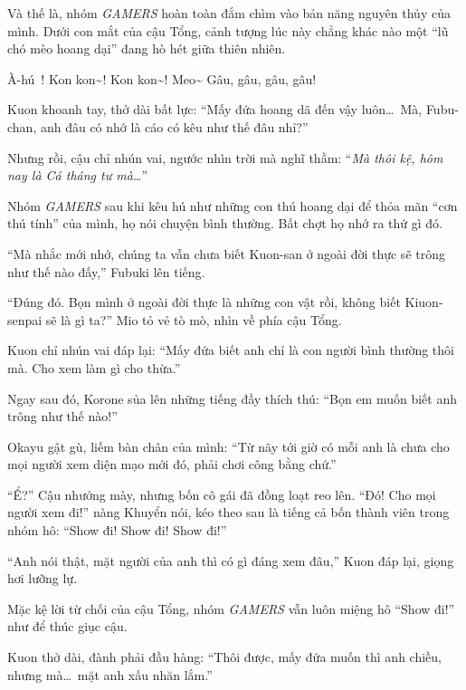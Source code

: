 \documentclass[../main.tex]{subfiles}
\begin{document}
Và thế là, nhóm \textit{GAMERS} hoàn toàn đắm chìm vào bản năng nguyên thủy của mình. Dưới con mắt của cậu Tổng, cảnh tượng lúc này chẳng khác nào một ``lũ chó mèo hoang dại'' đang hò hét giữa thiên nhiên.

\begin{dialogue}
     À-hú~!
     Kon kon\~{}! Kon kon\~{}!
     Meo\~{}
     Gâu, gâu, gâu, gâu!
\end{dialogue}

Kuon khoanh tay, thở dài bất lực: ``Mấy đứa hoang dã đến vậy luôn\dots\ Mà, Fubu-chan, anh đâu có nhớ là cáo có kêu như thế đâu nhỉ?''

Nhưng rồi, cậu chỉ nhún vai, ngước nhìn trời mà nghĩ thầm: ``\textit{Mà thôi kệ, hôm nay là Cá tháng tư mà\dots}''

\omk

Nhóm \textit{GAMERS} sau khi kêu hú như những con thú hoang dại để thỏa mãn ``cơn thú tính'' của mình, họ nói chuyện bình thường. Bất chợt họ nhớ ra thứ gì đó.

``Mà nhắc mới nhớ, chúng ta vẫn chưa biết Kuon-san ở ngoài đời thực sẽ trông như thế nào đấy,'' Fubuki lên tiếng.

``Đúng đó. Bọn mình ở ngoài đời thực là những con vật rồi, không biết Kiuon-senpai sẽ là gì ta?'' Mio tỏ vẻ tò mò, nhìn về phía cậu Tổng.

Kuon chỉ nhún vai đáp lại: ``Mấy đứa biết anh chỉ là con người bình thường thôi mà. Cho xem làm gì cho thừa.''

Ngay sau đó, Korone sủa lên những tiếng đầy thích thú: ``Bọn em muốn biết anh trông như thế nào!''

Okayu gật gù, liếm bàn chân của mình: ``Từ nãy tới giờ có mỗi anh là chưa cho mọi người xem diện mạo mới đó, phải chơi công bằng chứ.''

``Ể?'' Cậu nhướng mày, nhưng bốn cô gái đã đồng loạt reo lên. ``Đó! Cho mọi người xem đi!'' nàng Khuyển nói, kéo theo sau là tiếng cả bốn thành viên trong nhóm hô: ``Show đi! Show đi! Show đi!''

``Anh nói thật, mặt người của anh thì có gì đáng xem đâu,'' Kuon đáp lại, giọng hơi lưỡng lự.

Mặc kệ lời từ chối của cậu Tổng, nhóm \textit{GAMERS} vẫn luôn miệng hô ``Show đi!'' như để thúc giục cậu.

Kuon thở dài, đành phải đầu hàng: ``Thôi được, mấy đứa muốn thì anh chiều, nhưng mà\dots\ mặt anh xấu nhăn lắm.''
\end{document}
